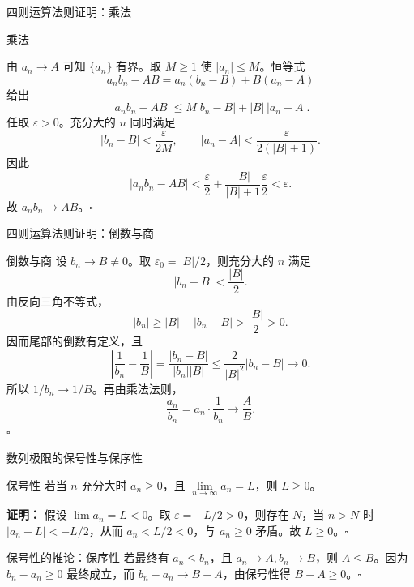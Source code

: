 \documentclass[aspectratio=169,10pt]{ctexbeamer}
\newcommand{\eps}{\varepsilon}
\newcommand{\qedhereppt}{\hfill$\square$}
\begin{document}
\begin{frame}{四则运算法则证明：乘法}
  \small
  \begin{block}{乘法}
  	
  
  由 $a_n\to A$ 可知 $\{a_n\}$ 有界。取 $M\ge1$ 使 $|a_n|\le M$。恒等式
  \[
    a_nb_n-AB=a_n(b_n-B)+B(a_n-A)
  \]
  给出
  \[
    |a_nb_n-AB|\le M|b_n-B|+|B|\,|a_n-A|.
  \]
  任取 $\eps>0$。充分大的 $n$ 同时满足
  \[
    |b_n-B|<\frac\eps{2M},\qquad
    |a_n-A|<\frac\eps{2(|B|+1)}.
  \]
  因此
  \[
    |a_nb_n-AB|<\frac\eps2+\frac{|B|}{|B|+1}\frac\eps2<\eps.
  \]
  故 $a_nb_n\to AB$。\qedhereppt
  \end{block}
\end{frame}

\begin{frame}{四则运算法则证明：倒数与商}
  \small
  \begin{block}{倒数与商}
  设 $b_n\to B\ne0$。取 $\eps_0=|B|/2$，则充分大的 $n$ 满足
  \[
    |b_n-B|<\frac{|B|}{2}.
  \]
  由反向三角不等式，
  \[
    |b_n|\ge |B|-|b_n-B|>\frac{|B|}{2}>0.
  \]
  因而尾部的倒数有定义，且
  \[
    \left|\frac1{b_n}-\frac1B\right|
    =\frac{|b_n-B|}{|b_n||B|}
    \le\frac{2}{|B|^2}|b_n-B|\to0.
  \]
  所以 $1/b_n\to1/B$。再由乘法法则，
  \[
    \frac{a_n}{b_n}=a_n\cdot\frac1{b_n}\longrightarrow\frac AB.
  \]
  \qedhereppt
\end{block}
\end{frame}

\begin{frame}{数列极限的保号性与保序性}
  \footnotesize
  
  \begin{block}{保号性}
    若当 \(n\) 充分大时 \(a_n \geq 0\)，且 \(\lim\limits_{n \to \infty} a_n = L\)，则 \(L \geq 0\)。
  \end{block}
  \vspace{0.3cm}
  \textbf{证明：}
  假设 \(\lim a_n = L < 0\)。取 \(\varepsilon = -L/2 > 0\)，则存在 \(N\)，当 \(n > N\) 时 \(|a_n - L| < -L/2\)，从而 \(a_n < L/2 < 0\)，与 \(a_n \geq 0\) 矛盾。故 \(L \geq 0\)。\(\square\)
  \vspace{0.7cm}
  \begin{block}{保号性的推论：保序性}
    若最终有 $a_n\le b_n$，且 $a_n\to A,b_n\to B$，则 $A\le B$。因为 $b_n-a_n\ge0$ 最终成立，而 $b_n-a_n\to B-A$，由保号性得 $B-A\ge0$。\qedhereppt
  \end{block}
\end{frame}
\end{document}
